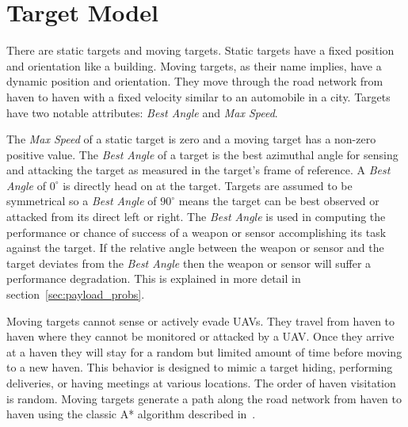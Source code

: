 \section{Target Model}

There are static targets and moving targets.  Static targets have a fixed position and orientation like a building.  Moving targets, as their name implies, have a dynamic position and orientation.  They move through the road network from haven to haven with a fixed velocity similar to an automobile in a city.  Targets have two notable attributes: \textit{Best Angle} and \textit{Max Speed}.

The \textit{Max Speed} of a static target is zero and a moving target has a non-zero positive value.  The \textit{Best Angle} of a target is the best azimuthal angle for sensing and attacking the target as measured in the target's frame of reference.  A \textit{Best Angle} of $0^{\circ}$ is directly head on at the target.  Targets are assumed to be symmetrical so a \textit{Best Angle} of $90^{\circ}$ means the target can be best observed or attacked from its direct left or right.  The \textit{Best Angle} is used in computing the performance or chance of success of a weapon or sensor accomplishing its task against the target.  If the relative angle between the weapon or sensor and the target deviates from the \textit{Best Angle} then the weapon or sensor will suffer a performance degradation.  This is explained in more detail in section~\ref{sec:payload_probs}.

Moving targets cannot sense or actively evade UAVs.  They travel from haven to haven where they cannot be monitored or attacked by a UAV.  Once they arrive at a haven they will stay for a random but limited amount of time before moving to a new haven.  This behavior is designed to mimic a target hiding, performing deliveries, or having meetings at various locations.  The order of haven visitation is random.  Moving targets generate a path along the road network from haven to haven using the classic A* algorithm described in~\citet{wiki:astar}.

